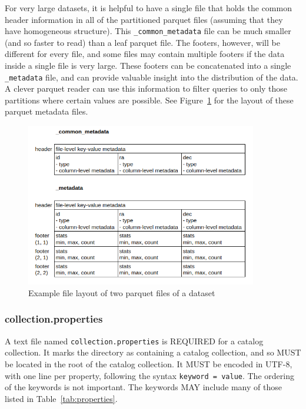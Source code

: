 \documentclass[11pt,a4paper]{ivoa}
\begin{document}
For very large datasets, it is helpful to have a single file that holds the common header information in all of the partitioned parquet files (assuming that they have homogeneous structure).
This \texttt{\_common\_metadata} file can be much smaller (and so faster to read) than a leaf parquet file.
The footers, however, will be different for every file, and some files may contain multiple footers if the data inside a single file is very large.
These footers can be concatenated into a single \texttt{\_metadata} file, and can provide valuable insight into the distribution of the data. 
A clever parquet reader can use this information to filter queries to only those partitions where certain values are possible.
See Figure~\ref{fig:parquetMetadata} for the layout of these parquet metadata files.

\begin{figure}
\centering
\includegraphics[width=0.9\textwidth]{metadata_files.png}
\caption{Example file layout of two parquet files of a dataset}
\label{fig:parquetMetadata}
\end{figure}

\subsubsection{collection.properties}\label{sec:collectionProperties}
A text file named \texttt{collection.properties} is REQUIRED for a catalog collection.
It marks the directory as containing a catalog collection, and so MUST be located in the 
root of the catalog collection.
It MUST be encoded in UTF-8, with one line per property, following the syntax \texttt{keyword = value}.
The ordering of the keywords is not important. The keywords MAY include many of those listed in Table~\ref{tab:properties}.
\end{document}
